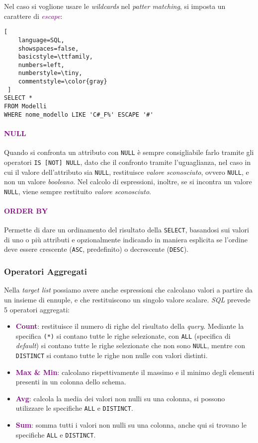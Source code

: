 Nel caso si voglione usare le \emph{wildcards} nel \emph{patter matching}, si imposta un carattere di \emph{\textcolor{purple}{escape}}:
\begin{lstlisting}[
    language=SQL,
    showspaces=false,
    basicstyle=\ttfamily,
    numbers=left,
    numberstyle=\tiny,
    commentstyle=\color{gray}
 ]
SELECT *
FROM Modelli
WHERE nome_modello LIKE 'C#_F%' ESCAPE '#'
\end{lstlisting}

\paragraph{\textcolor{purple}{NULL}} Quando si confronta un attributo
con \verb|NULL| è sempre consigliabile farlo tramite gli operatori \verb|IS [NOT] NULL|, dato che
il confronto tramite l'uguaglianza, nel caso in cui il valore dell'attributo sia \verb|NULL|, restituisce \emph{valore sconosciuto},
ovvero \verb|NULL|, e non un valore \emph{booleano}.
Nel calcolo di espressioni, inoltre, se si incontra
un valore \verb|NULL|, viene sempre restituito \emph{valore sconosciuto}.

\paragraph{\textcolor{purple}{ORDER BY}} Permette di dare un ordinamento
del risultato della \verb|SELECT|, basandosi sui valori di uno o più attributi e opzionalmente
indicando in maniera esplicita se l'ordine deve essere crescente (\verb|ASC|, predefinito) o decrescente
(\verb|DESC|).

\subsubsection{Operatori Aggregati}

Nella \emph{target list} possiamo avere anche espressioni che calcolano
valori a partire da un insieme di ennuple, e che restituiscono un singolo valore
scalare. \emph{SQL} prevede 5 operatori aggregati:
\begin{itemize}
    \item \textbf{\textcolor{purple}{Count}}: restituisce il numero di righe del risultato della \emph{query}. Mediante
        la specifica \verb|(*)| si contano tutte le righe selezionate, con \verb|ALL| (specifica di \emph{default}) si contano tutte le righe selezionate che non sono \verb|NULL|,
        mentre con \verb|DISTINCT| si contano tutte le righe non nulle con valori distinti.
    \item \textbf{\textcolor{purple}{Max \& Min}}: calcolano rispettivamente il massimo e il minimo degli elementi presenti
        in un colonna dello schema.
    \item \textbf{\textcolor{purple}{Avg}}: calcola la media dei valori non nulli su una colonna, si possono utilizzare le specifiche \verb|ALL| e \verb|DISTINCT|.
    \item \textbf{\textcolor{purple}{Sum}}: somma tutti i valori non nulli su una colonna, anche qui si trovano le specifiche \verb|ALL| e \verb|DISTINCT|.
\end{itemize}

